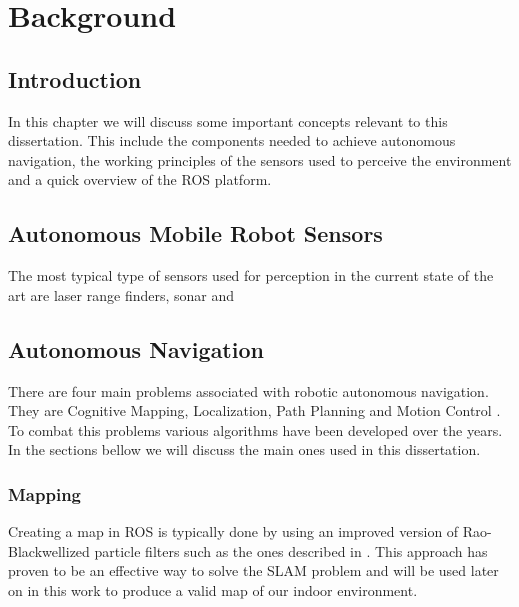 \chapter{Background} \label{ch:Concepts}

\section{Introduction}
In this chapter we will discuss some important concepts relevant to this dissertation. This include the components needed to achieve autonomous navigation, the working principles of the sensors used to perceive the environment and a quick overview of the \ac{ROS} platform.
\section{Autonomous Mobile Robot Sensors}
The most typical type of sensors used for perception in the current state of the art are laser range finders, sonar and 

\section {Autonomous Navigation}
There are four main problems associated with robotic autonomous navigation. They are Cognitive Mapping, Localization, Path Planning and Motion Control \cite{baranov2014}. To combat this problems various algorithms have been developed over the years. In the sections bellow we will discuss the main ones used in this dissertation.

\subsection{Mapping}

Creating a map in ROS is typically done by using an improved version of  Rao-Blackwellized particle filters such as the ones described in \cite{grisetti2007improved}. This approach has proven to be an effective way to solve the \ac{SLAM} problem and will be used later on in this work to produce a valid map of our indoor environment.
